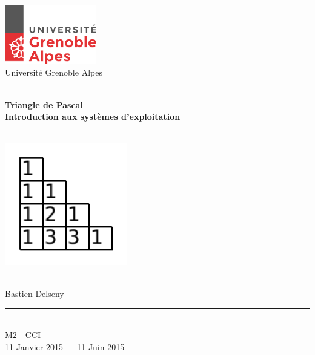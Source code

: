 \begin{titlepage}
  \begin{center}
	
	
      \begin{flushleft} 
       \includegraphics[width=0.3\textwidth]{./images/logo-uga}~\\
       {\small Université Grenoble Alpes}
      \end{flushleft}
    
    
    \vfill

    \HRule \\[0.4cm]
    { \huge \bfseries Triangle de Pascal\\}
	{ \large \bfseries Introduction aux systèmes d'exploitation\\[.4em]}
    \HRule\\[4em]
    
	\begin{centering}
		\includegraphics[width=0.4\textwidth]{./images/triangle}
	\end{centering}\\[4em]
	
	\large{Bastien Delseny}\\
   \vfill
    
    \rule{\linewidth}{0.1mm} \\[0.3cm]
    
    {\footnotesize M2 - CCI}\\[0.3cm]
    
    
    {\large 11 Janvier 2015 — 11 Juin 2015} \PAR

  \end{center}
\end{titlepage}

